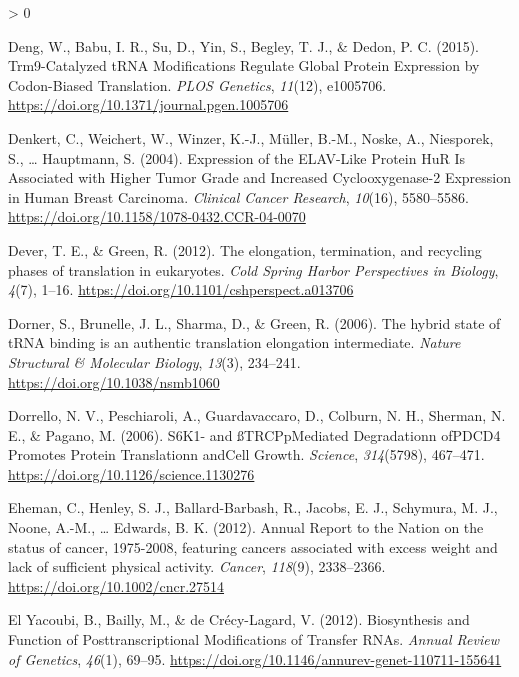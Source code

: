 \documentclass[
  12pt,
  openany]{book}
\newlength{\cslhangindent}
\newenvironment{CSLReferences}[2] %
 {%
  \setlength{\parindent}{0pt}
  \ifodd #1 \everypar{\setlength{\hangindent}{\cslhangindent}}\ignorespaces\fi
  \ifnum #2 > 0
  \setlength{\parskip}{#2\baselineskip}
  \fi
 }%
 {}
\begin{document}
\begin{CSLReferences}{1}{0}
\leavevmode\hypertarget{ref-Deng2015}{}%
Deng, W., Babu, I. R., Su, D., Yin, S., Begley, T. J., \& Dedon, P. C. (2015). Trm9-{Catalyzed tRNA Modifications Regulate Global Protein Expression} by {Codon}-{Biased Translation}. \emph{PLOS Genetics}, \emph{11}(12), e1005706. \url{https://doi.org/10.1371/journal.pgen.1005706}

\leavevmode\hypertarget{ref-Denkert2004}{}%
Denkert, C., Weichert, W., Winzer, K.-J., Müller, B.-M., Noske, A., Niesporek, S., \ldots{} Hauptmann, S. (2004). Expression of the {ELAV}-{Like Protein HuR Is Associated} with {Higher Tumor Grade} and {Increased Cyclooxygenase}-2 {Expression} in {Human Breast Carcinoma}. \emph{Clinical Cancer Research}, \emph{10}(16), 5580--5586. \url{https://doi.org/10.1158/1078-0432.CCR-04-0070}

\leavevmode\hypertarget{ref-Dever2012}{}%
Dever, T. E., \& Green, R. (2012). The elongation, termination, and recycling phases of translation in eukaryotes. \emph{Cold Spring Harbor Perspectives in Biology}, \emph{4}(7), 1--16. \url{https://doi.org/10.1101/cshperspect.a013706}

\leavevmode\hypertarget{ref-Dorner2006}{}%
Dorner, S., Brunelle, J. L., Sharma, D., \& Green, R. (2006). The hybrid state of {tRNA} binding is an authentic translation elongation intermediate. \emph{Nature Structural \& Molecular Biology}, \emph{13}(3), 234--241. \url{https://doi.org/10.1038/nsmb1060}

\leavevmode\hypertarget{ref-Dorrello2006}{}%
Dorrello, N. V., Peschiaroli, A., Guardavaccaro, D., Colburn, N. H., Sherman, N. E., \& Pagano, M. (2006). {S6K1}- and {ßTRCP}p{Mediated Degradation}n of{PDCD4 Promotes Protein Translation}n and{Cell Growth}. \emph{Science}, \emph{314}(5798), 467--471. \url{https://doi.org/10.1126/science.1130276}

\leavevmode\hypertarget{ref-Eheman2012}{}%
Eheman, C., Henley, S. J., Ballard-Barbash, R., Jacobs, E. J., Schymura, M. J., Noone, A.-M., \ldots{} Edwards, B. K. (2012). Annual {Report} to the {Nation} on the status of cancer, 1975-2008, featuring cancers associated with excess weight and lack of sufficient physical activity. \emph{Cancer}, \emph{118}(9), 2338--2366. \url{https://doi.org/10.1002/cncr.27514}

\leavevmode\hypertarget{ref-ElYacoubi2012}{}%
El Yacoubi, B., Bailly, M., \& de Crécy-Lagard, V. (2012). Biosynthesis and {Function} of {Posttranscriptional Modifications} of {Transfer RNAs}. \emph{Annual Review of Genetics}, \emph{46}(1), 69--95. \url{https://doi.org/10.1146/annurev-genet-110711-155641}


\end{CSLReferences}
\end{document}
